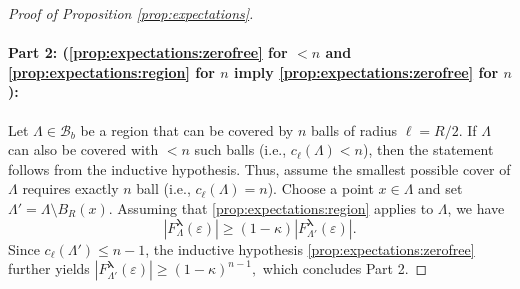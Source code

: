 \documentclass[10pt]{amsart}
\theoremstyle{definition}
\theoremstyle{remark}
\newcommand{\region}{\Lambda}
\newcommand{\activities}{\pmb{\lambda}}
\newcommand{\borel}{\mathcal{B}}
\newcommand{\absolute}[1]{\left\lvert#1\right\rvert}
\begin{document}
\begin{proof}[Proof of Proposition \ref{prop:expectations}]
		\paragraph{\texorpdfstring{\textbf{Part 2: (\ref{prop:expectations:zerofree} for $< n$ and \ref{prop:expectations:region} for $n$ imply \ref{prop:expectations:zerofree} for $n$)}:}{Part 2: ((i) for < n and (ii) for n imply (i) for n)}}
		Let $\region \in \borel_b$ be a region that can be covered by $n$ balls of radius $\ell = R/2$.
		If $\region$ can also be covered with $< n$ such balls (i.e., $c_{\ell}(\region) < n$), then the statement follows from the inductive hypothesis.
		Thus, assume the smallest possible cover of $\region$ requires exactly $n$ ball (i.e., $c_{\ell}(\region) = n$).
		Choose a point $x \in \region$ and set $\region' = \region \setminus B_{R}(x)$.
		Assuming that \ref{prop:expectations:region} applies to $\region$, we have
		\[
		\absolute{F_{\region}^{\activities}(\varepsilon)} \ge (1 - \kappa)  \absolute{F_{\region'}^{\activities}(\varepsilon)} .
		\]
		Since $c_{\ell}(\region') \le n-1$, the inductive hypothesis \ref{prop:expectations:zerofree} further yields $\absolute{F_{\region'}^{\activities}(\varepsilon)} \ge (1-\kappa)^{n-1},$ which concludes Part 2.
		
		\medskip 
		

\end{proof}
\end{document}
